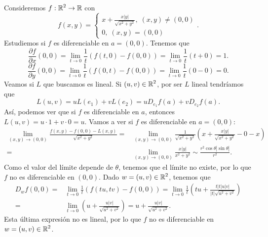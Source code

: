 \begin{eg}
Consideremos $\displaystyle f : \mathbb{R}^{2} \to \mathbb{R} $ con 
\[f\left(x,y\right) = 
\begin{cases}
x + \frac{x \left|y\right|}{\sqrt{x^{2}+y^{2}}}, \; \left(x,y\right) \neq \left(0,0\right) \\
0, \; \left(x,y\right) = \left(0,0\right)
\end{cases}
.\]
Estudiemos si $\displaystyle f $ es diferenciable en $\displaystyle a = \left(0,0\right) $. Tenemos que
\[\frac{\partial f}{\partial x}\left(0,0\right) = \lim_{t \to 0}\frac{1}{t}\left(f\left(t,0\right)-f\left(0,0\right)\right) = \lim_{t \to 0}\frac{1}{t}\left(t+0\right) = 1 .\]
\[\frac{\partial f}{\partial y}\left(0,0\right) = \lim_{t \to 0}\frac{1}{t}\left(f\left(0,t\right)-f\left(0,0\right)\right) = \lim_{t \to 0}\frac{1}{t}\left(0 - 0\right) = 0 .\]
Veamos si $\displaystyle L $ que buscamos es lineal. Si $\displaystyle \left(u,v\right) \in \mathbb{R}^{2} $, por ser $\displaystyle L $ lineal tendríamos que
\[L\left(u,v\right) = uL\left(e_{1}\right) + vL\left(e_{2}\right) = u D_{e_{1}}f\left(a\right)+vD_{e_{2}}f\left(a\right)  .\]
Así, podemos ver que si $\displaystyle f $ es diferenciable en $\displaystyle a $, entonces $\displaystyle L\left(u,v\right) = u \cdot 1 + v \cdot 0 = u$. Vamos a ver si $\displaystyle f $ es diferenciable en $\displaystyle a = \left(0,0\right) $:
\[
\begin{split}
	\lim_{\left(x,y\right) \to \left(0,0\right)}\frac{f\left(x,y\right)-f\left(0,0\right)-L\left(x,y\right)}{\sqrt{x^{2}+y^{2}}} = & \lim_{\left(x,y\right) \to \left(0,0\right)}\frac{1}{\sqrt{x^{2}+y^{2}}} \left(x + \frac{x \left|y\right|}{\sqrt{x^{2}+y^{2}}}-0-x\right) \\
	= & \lim_{\left(x,y\right) \to \left(0,0\right)}\frac{x \left|y\right|}{x^{2}+y^{2}} \sim \frac{r^{2}\cos\theta \left|\sin\theta \right|}{r^{2}}.
\end{split}
\]
Como el valor del límite depende de $\displaystyle \theta $, tenemos que el límite no existe, por lo que $\displaystyle f $ no es diferenciable en $\displaystyle \left(0,0\right) $. Dado $\displaystyle w = \left(u,v\right) \in \mathbb{R}^{2} $, tenemos que 
\[
\begin{split}
	D_{w}f\left(0,0\right) = & \lim_{t \to 0}\frac{1}{t}\left(f\left(tu,tv\right)-f\left(0,0\right)\right) = \lim_{t \to 0}\frac{1}{t}\left(tu + \frac{t \left|t\right|u \left|v\right|}{ \left|t\right|\sqrt{u^{2}+v^{2}}}\right) \\
	= & \lim_{t \to 0}\left(u +\frac{u \left|v\right|}{ \sqrt{u^{2}+v^{2}}}\right) = u + \frac{u \left|v\right|}{\sqrt{u^{2}+v^{2}}} .
\end{split}
\]
Esta última expresión no es lineal, por lo que $\displaystyle f $ no es diferenciable en $\displaystyle w = \left(u,v\right) \in \mathbb{R}^{2} $.
\end{eg}
